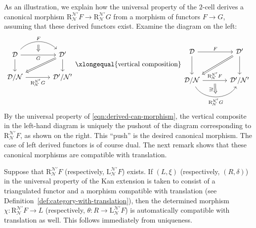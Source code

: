 As an illustration, we explain how the universal property of the $2$-cell
derives a canonical morphism
$\mathrm{R}^{\mathcal{N}'}_{\mathcal{N}}F \to
\mathrm{R}^{\mathcal{N}'}_{\mathcal{N}}G$ from a morphism of functors
$F \to G$, assuming that these derived functors exist. Examine the diagram on
the left:
\[\begin{tikzcd}[column sep=large]
	\mathcal{D} \arrow[r, bend left=45, "F", ""' {name=U}] \arrow[r, "G"', "" {name=D}] \arrow[d] & \mathcal{D}' \arrow[d] \arrow[Rightarrow, ld] \\
	\mathcal{D}/\mathcal{N} \arrow[r, "{\mathrm{R}^{\mathcal{N}'}_{\mathcal{N}}G }"'] & \mathcal{D}'/\mathcal{N}' \arrow[Rightarrow, from=U, to=D]
\end{tikzcd} \xlongequal{\text{vertical composition}} \begin{tikzcd}[column sep=large, row sep=large]
	\mathcal{D} \arrow[r, "F"] \arrow[d] & \mathcal{D}' \arrow[d] \arrow[Rightarrow, ld] \\
	\mathcal{D}/\mathcal{N} \arrow[r, "{\mathrm{R}^{\mathcal{N}'}_{\mathcal{N}}F }", ""' {name=U}] \arrow[bend right=60, r, "{\mathrm{R}^{\mathcal{N}'}_{\mathcal{N}}G }"', "" {name=D}] & \mathcal{D}'/\mathcal{N}' \arrow[Rightarrow, from=U, to=D, "{\exists!}"' near start]
\end{tikzcd}\]
By the universal property of \eqref{eqn:derived-can-morphism}, the vertical
composite in the left-hand diagram is uniquely the pushout of the diagram
corresponding to $\mathrm{R}^{\mathcal{N}'}_{\mathcal{N}}F$, as shown on the
right. This ``push'' is the desired canonical morphism. The case of left
derived functors is of course dual. The next remark shows that these canonical
morphisms are compatible with translation.

\begin{remark}\label{rem:derived-can-morphism}
	Suppose that $\mathrm{R}^{\mathcal{N}'}_{\mathcal{N}}F$ (respectively,
	$\mathrm{L}^{\mathcal{N}'}_{\mathcal{N}}F$) exists. If $(L,\xi)$
	(respectively, $(R,\delta)$) in the universal property of the Kan extension
	is taken to consist of a triangulated functor and a morphism compatible with
	translation (see Definition~\ref{def:category-with-translation}), then the
	determined morphism
	$\chi: \mathrm{R}^{\mathcal{N}'}_{\mathcal{N}}F \to L$ (respectively,
	$\theta: R \to \mathrm{L}^{\mathcal{N}'}_{\mathcal{N}}F$) is automatically
	compatible with translation as well. This follows immediately from
	uniqueness.
\end{remark}


